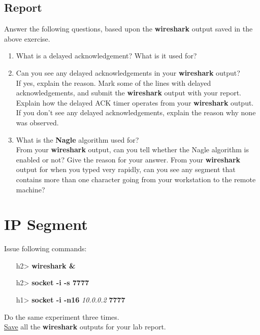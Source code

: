 \documentclass[10pt,a4paper]{article}
\numberwithin{equation}{section}
\numberwithin{figure}{section}
\numberwithin{table}{section}
\begin{document}
    \subsection*{Report}
    Answer the following questions, based upon the \textbf{wireshark} output saved in the above exercise.
    \begin{enumerate}
        \item What is a delayed acknowledgement?
        What is it used for?
        \item Can you see any delayed acknowledgements in your \textbf{wireshark} output? \\
        If yes, explain the reason.
        Mark some of the lines with delayed acknowledgements, and submit the \textbf{wireshark} output with your report. \\
        Explain how the delayed ACK timer operates from your \textbf{wireshark} output. \\
        If you don’t see any delayed acknowledgements, explain the reason why none was observed.
        \item What is the \textbf{Nagle} algorithm used for? \\
        From your \textbf{wireshark} output, can you tell whether the Nagle algorithm is enabled or not?
        Give the reason for your answer.
        From your \textbf{wireshark} output for when you typed very rapidly, can you see any segment that contains more than one character going from your workstation to the remote machine?
    \end{enumerate}

\section*{IP Segment}
    Issue following commands:
    \begin{itemize}
        \item [h2>] \textbf{wireshark \&}
        \item [h2>] \textbf{socket -i -s 7777}
        \item [h1>] \textbf{socket -i -n16} \textit{10.0.0.2} \textbf{7777}
    \end{itemize}
    Do the same experiment three times. \\
    \underline{Save} all the \textbf{wireshark} outputs for your lab report.
\end{document}
